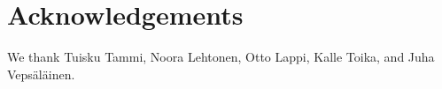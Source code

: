 \documentclass[10pt,letterpaper,floatsintext]{article}
\begin{document}


\section{Acknowledgements}
We thank Tuisku Tammi, Noora Lehtonen, Otto Lappi, Kalle Toika, and Juha Veps\"{a}l\"{a}inen.





\setlength{\bibleftmargin}{.125in}
\setlength{\bibindent}{-\bibleftmargin}


\end{document}

